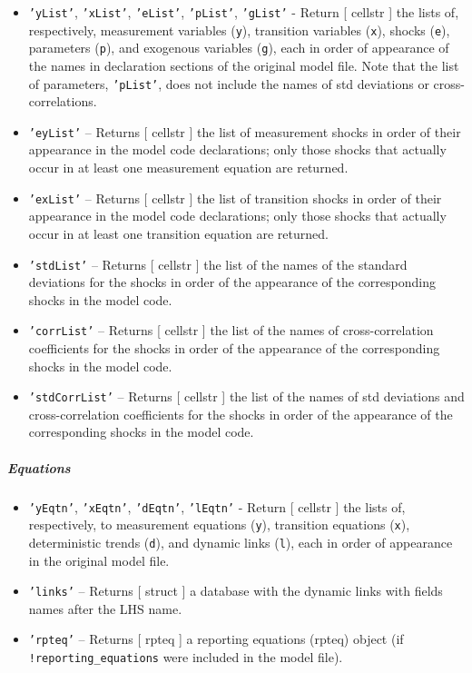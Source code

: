 \begin{itemize}
\item
  \texttt{'yList'}, \texttt{'xList'}, \texttt{'eList'},
  \texttt{'pList'}, \texttt{'gList'} - Return {[} cellstr {]} the lists
  of, respectively, measurement variables (\texttt{y}), transition
  variables (\texttt{x}), shocks (\texttt{e}), parameters (\texttt{p}),
  and exogenous variables (\texttt{g}), each in order of appearance of
  the names in declaration sections of the original model file. Note
  that the list of parameters, \texttt{'pList'}, does not include the
  names of std deviations or cross-correlations.
\item
  \texttt{'eyList'} -- Returns {[} cellstr {]} the list of measurement
  shocks in order of their appearance in the model code declarations;
  only those shocks that actually occur in at least one measurement
  equation are returned.
\item
  \texttt{'exList'} -- Returns {[} cellstr {]} the list of transition
  shocks in order of their appearance in the model code declarations;
  only those shocks that actually occur in at least one transition
  equation are returned.
\item
  \texttt{'stdList'} -- Returns {[} cellstr {]} the list of the names of
  the standard deviations for the shocks in order of the appearance of
  the corresponding shocks in the model code.
\item
  \texttt{'corrList'} -- Returns {[} cellstr {]} the list of the names
  of cross-correlation coefficients for the shocks in order of the
  appearance of the corresponding shocks in the model code.
\item
  \texttt{'stdCorrList'} -- Returns {[} cellstr {]} the list of the
  names of std deviations and cross-correlation coefficients for the
  shocks in order of the appearance of the corresponding shocks in the
  model code.
\end{itemize}

\subparagraph{Equations}

\begin{itemize}
\item
  \texttt{'yEqtn'}, \texttt{'xEqtn'}, \texttt{'dEqtn'}, \texttt{'lEqtn'}
  - Return {[} cellstr {]} the lists of, respectively, to measurement
  equations (\texttt{y}), transition equations (\texttt{x}),
  deterministic trends (\texttt{d}), and dynamic links (\texttt{l}),
  each in order of appearance in the original model file.
\item
  \texttt{'links'} -- Returns {[} struct {]} a database with the dynamic
  links with fields names after the LHS name.
\item
  \texttt{'rpteq'} -- Returns {[} rpteq {]} a reporting equations
  (rpteq) object (if \texttt{!reporting\_equations} were included in the
  model file).
\end{itemize}

